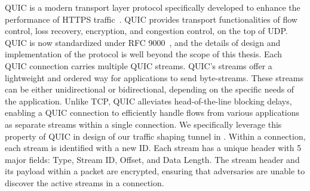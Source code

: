 
QUIC is a modern transport layer protocol specifically developed to enhance the performance of HTTPS traffic~\cite{langley2017quic}.
QUIC provides transport functionalities of flow control, loss recovery, encryption, and congestion control, on the top of UDP.
QUIC is now standardized under RFC 9000~\cite{rfc9000}, and the details of design and implementation of the protocol is well beyond the scope of this thesis.
Each QUIC connection carries multiple QUIC streams.
QUIC's streams offer a lightweight and ordered way for applications to send byte-streams.
These streams can be either unidirectional or bidirectional, depending on the specific needs of the application.
Unlike TCP, QUIC alleviates head-of-the-line blocking delays, enabling a QUIC connection to efficiently handle flows from various applications as separate streams within a single connection. 
We specifically leverage this property of QUIC in design of our traffic shaping tunnel in .
Within a connection, each stream is identified with a new ID.
Each stream has a unique header with 5 major fields: Type, Stream ID, Offset, and Data Length.
The stream header and its payload within a packet are encrypted, ensuring that adversaries are unable to discover the active streams in a connection.


